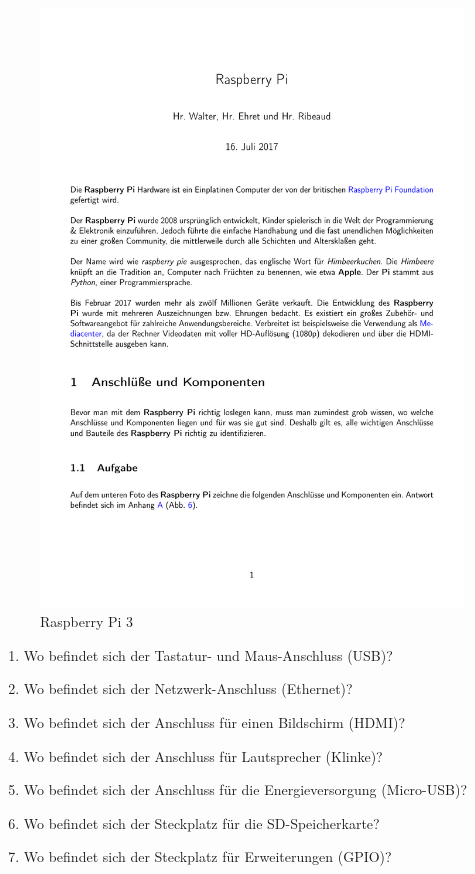 \documentclass[12pt,a4paper]{article}
\begin{document}
\begin{figure}[H]
\centering
\includegraphics[scale=1.3]{raspberry}
\caption{Raspberry Pi 3}
\label{fig:rp}
\end{figure}

\begin{enumerate}
\item Wo befindet sich der Tastatur- und Maus-Anschluss (USB)?
\item Wo befindet sich der Netzwerk-Anschluss (Ethernet)?
\item Wo befindet sich der Anschluss für einen Bildschirm (HDMI)?
\item Wo befindet sich der Anschluss für Lautsprecher (Klinke)?
\item Wo befindet sich der Anschluss für die Energieversorgung (Micro-USB)?
\item Wo befindet sich der Steckplatz für die SD-Speicherkarte?
\item Wo befindet sich der Steckplatz für Erweiterungen (GPIO)?
\end{enumerate}
\end{document}
